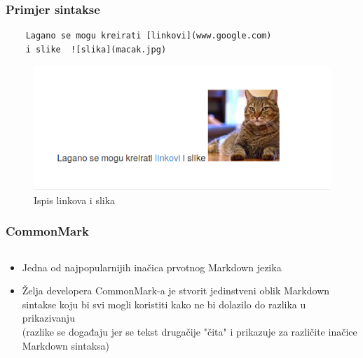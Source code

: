 \documentclass{beamer}
\begin{document}
\begin{frame}[fragile]
	\frametitle{Primjer sintakse}
	
	\begin{verbatim}
	Lagano se mogu kreirati [linkovi](www.google.com)
	i slike  ![slika](macak.jpg)

	\end{verbatim}

	\begin{figure}[b]
	\caption{Ispis linkova i slika}
	\includegraphics[width = 0.8\linewidth]{Slike/kod2.png}
	\end{figure}

\end{frame}





\begin{frame}
	\frametitle{CommonMark}

 	\begin{minipage}[0.2\textheight]{\textwidth}
 	\begin{columns}[T]
 	\begin{column}{0.8\textwidth}
 	\begin{itemize}
		\item{Jedna od najpopularnijih inačica prvotnog Markdown jezika}
		\item{Želja developera CommonMark-a je stvorit jedinstveni oblik Markdown sintakse koju bi svi mogli koristiti kako ne bi dolazilo do razlika u prikazivanju \\(razlike se događaju jer se tekst drugačije "čita" i prikazuje za različite inačice Markdown sintaksa)}
	\end{itemize}
	\end{column}
	\end{columns}
	\end{minipage}

\end{frame}
\end{document}
